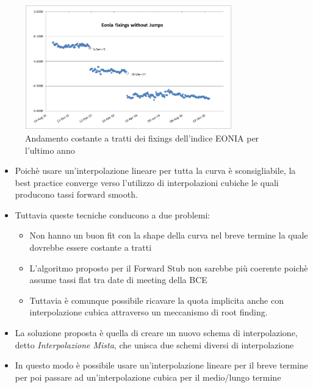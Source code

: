 \begin{tframe}
\begin{figure}[!h]
\centering
\includegraphics[width=0.8\textwidth]{eoniafixings.png}
\caption{Andamento costante a tratti dei fixings dell'indice EONIA per l'ultimo anno}
\label{fig:eoniafixings}
\end{figure}
\end{tframe}
\begin{tframe}
\begin{itemize}
\item Poichè usare un'interpolazione lineare per tutta la curva è sconsigliabile, la best practice converge verso l'utilizzo di interpolazioni cubiche le quali producono tassi forward smooth.
\item Tuttavia queste tecniche conducono a due problemi:
   \begin{itemize}
   \item Non hanno un buon fit con la shape della curva nel breve termine la quale dovrebbe essere costante a tratti
   \item L'algoritmo proposto per il Forward Stub non sarebbe più coerente poichè assume tassi flat tra date di meeting della BCE
   \item Tuttavia è comunque possibile ricavare la quota implicita anche con interpolazione cubica attraverso un meccanismo di root finding.
   \end{itemize}
\item La soluzione proposta è quella di creare un nuovo schema di interpolazione, detto {\it Interpolazione Mista}, che unisca due schemi diversi di interpolazione
\item In questo modo è possibile usare un'interpolazione lineare per il breve termine per poi passare ad un'interpolazione cubica per il medio/lungo termine
\end{itemize}
\end{tframe}
